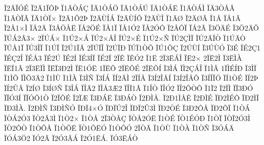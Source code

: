 {^^cf2^^c4^^cf^^d3^^c9
^^cf2^^c41^^cf^^d4^^de
^^cf1^^c4^^d2^^c1^^c7
^^cf^^c41^^d2^^c1^^d6
^^cf^^c41^^d2^^c1^^da
^^cf^^c41^^d2^^c1^^cb
^^cf1^^c4^^d2^^c1^^cc
^^cf^^c43^^d2^^c5^^c2
^^cf1^^c4^^d2^^cf^^c2
^^cf^^c41^^d2^^cf^^d7
^^cf2^^c41^^d52^^de
^^cf2^^c4^^d9^^cd^^c1
^^cf2^^c4^^d9^^cd^^d5
^^cf2^^c4^^d9^^ce
^^cf1^^c4^^d8
^^cf2^^c4^^d8^^c2
^^cf1^^c5
^^cf^^c51^^c2
^^cf2^^c51^^d7^^cc
^^cf^^c52^^c4
^^cf3^^c5^^d6^^c5^^cb
^^cf^^c52^^d6^^c9
^^cf^^c51^^cf
^^cf^^c51^^d32
^^cf^^c52^^d3^^d4
^^cf2^^c5^^d4^^cf
^^cf^^c52^^c3
^^cf3^^d6^^c4^^c9
^^cf3^^d62^^c4^^d5
^^cf^^da^^c12^^c23^^d7
2^^cf^^da^^c1^^d7
^^cf1^^da2^^d7^^c1
^^cf^^da2^^d7^^c5^^ce
^^cf^^da2^^d7^^c9
^^cf1^^da2^^d7^^d1
^^cf^^da2^^c7^^cc^^cf
^^cf^^da2^^c4^^cf^^d2
^^cf1^^da^^c4^^d2
^^cf^^da^^c51^^cf
^^cf^^da3^^ce^^cf
^^cf1^^da^^cf
^^cf2^^da1^^cf^^c2
2^^cf^^da^^cf^^ce
^^cf2^^da^^cf^^d0
^^cf^^da^^cf1^^d2^^d5
^^cf^^da1^^d5^^c7
^^cf2^^da^^d9^^cd
^^cf3^^da^^d9^^d3
^^cf3^^c9
^^cf^^c92^^c71
^^cf^^c9^^c72^^ce
^^cf^^c9^^c53
^^cf^^c92^^da
^^cf^^c92^^cd
^^cf^^c93^^cd^^cf
^^cf^^c92^^cf
2^^cf^^ca
^^cf^^ca^^d32
^^cf1^^cb
2^^cf3^^cb^^c1^^ce
^^cf^^cb2^^d7
2^^cf^^cb2^^cc
^^cf3^^cb^^cc^^c0
^^cf^^cb^^cf1^^c2
2^^cf3^^cb^^cf^^cc
^^cf^^cb^^cf3^^d02^^cc
^^cf^^cb1^^d3^^cb
1^^cf^^cb^^d4
2^^cf^^cb^^d4^^c9
2^^cf^^cb^^d5^^cd
^^cf3^^cc^^c1
^^cf^^cc2^^c7^^c1^^ce
^^cf1^^cc^^c5
1^^cf^^cc^^c9^^cd^^d0
^^cf3^^cc^^cf
^^cf1^^cc^^d5
^^cf^^cc^^d53^^c42
^^cf1^^cc^^d9
^^cf1^^cc^^c0
^^cf3^^cc^^d1
^^cf3^^cd^^c1
^^cf^^cd2^^c2^^cc
2^^cf^^cd^^c5
^^cf3^^cd2^^ce^^c5^^cd
^^cf3^^cd2^^ce^^c5^^d4
^^cf3^^cd^^ce^^cf^^d6
^^cf^^cd1^^d2^^c9
^^cf^^cd2^^de
^^cf^^cd2^^db^^c5
^^cf2^^cd^^d8
^^cf3^^cd^^d8^^d1
^^cf3^^ce^^c1
^^cf^^ce^^c42
^^cf^^ce^^c53^^c62
^^cf^^ce^^cf1^^c2
^^cf1^^ce^^d2
^^cf^^ce^^d32
^^cf^^ce2^^d4^^d2^^d5
^^cf1^^cf2
^^cf2^^cf^^cc
^^cf^^cf3^^d0^^d3
^^cf^^cf^^d33^^cd
^^cf^^cf^^d3^^d41^^d2
^^cf2^^cf^^d4^^c9
^^cf2^^cf^^c6
^^cf3^^d0^^c1^^cb
^^cf3^^d0^^c1^^d2
^^cf2^^d0^^cc^^c5.
^^cf2^^d01^^cc^^c5^^ca
^^cf2^^d0^^cc^^c9
^^cf^^d02^^cc^^c9^^d4
^^cf^^d02^^cc^^cf
^^cf^^d03^^cc^^c0.
^^cf2^^d0^^cc^^d1
^^cf3^^d0^^cc^^d1^^d3
^^cf^^d0^^cf4^^d7^^d3
^^cf^^d0^^cf^^da2^^ce
^^cf^^d0^^cf2^^db3^^cc
^^cf^^d02^^d2^^c9
^^cf3^^d02^^d4^^c5
^^cf^^d02^^d4^^cf
^^cf1^^d2^^c1
^^cf^^d2^^c12^^d33
^^cf^^d22^^c23^^cc
^^cf1^^d22^^d7
^^cf1^^d2^^c5
2^^cf3^^d2^^c5^^c7
^^cf^^d2^^c52^^d3^^cb
^^cf1^^d2^^c9
^^cf^^d21^^c9^^d3^^d0
^^cf1^^d2^^cf
^^cf^^d2^^cf2^^d33^^cc
^^cf^^d22^^d4^^d2
^^cf1^^d2^^d5^^c5
^^cf1^^d2^^d5^^cb
^^cf^^d21^^d5^^cb^^d3
^^cf1^^d2^^d5^^d3
2^^cf^^d2^^c3
^^cf1^^d2^^d9
^^cf1^^d2^^c0
^^cf1^^d2^^d1
^^cf3^^d3^^c1^^c4
^^cf^^d3^^c13^^d62
^^cf^^d32^^c2
^^cf2^^d33^^c2^^c1
^^cf2^^d31^^cb^^c1.
^^cf^^d33^^cb^^c1^^d2
}
